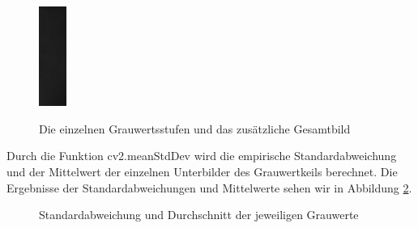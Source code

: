 \documentclass[12pt, oneside, a4paper, \docLanguage]{report}
\begin{document}
\begin{figure}[hbt!]
{        \includegraphics[width=0.08\textwidth]{media/gray5_versuch1.png}\label{fig:f5}}
        \hfill
    \caption{Die einzelnen Grauwertsstufen und das zusätzliche Gesamtbild}
    \label{fig:VERSUCH_1_AUSWERTUNG_GRAUWERTKEIL}
\end{figure}

Durch die Funktion cv2.meanStdDev wird die empirische Standardabweichung und der Mittelwert der einzelnen Unterbilder des Grauwertkeils berechnet. Die Ergebnisse der Standardabweichungen und Mittelwerte sehen wir in Abbildung \ref{fig:VERSUCH_1_AUSWERTUNG_BERECHNUNG}.

\begin{figure}[hbt!]
      \centering
      \hfill
      \caption{Standardabweichung und Durchschnitt der jeweiligen Grauwerte}
      \label{fig:VERSUCH_1_AUSWERTUNG_BERECHNUNG}
\end{figure}
\end{document}
